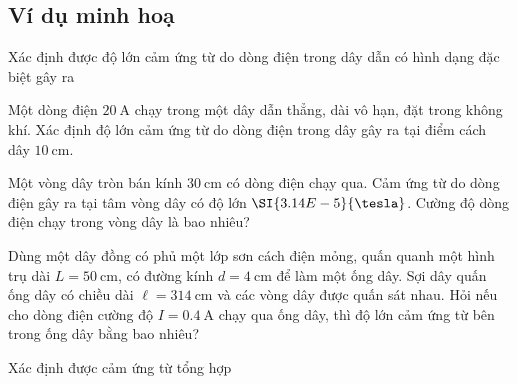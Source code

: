 \subsection{Ví dụ minh hoạ}
\begin{dang}{Xác định được độ lớn cảm ứng từ do dòng điện trong dây dẫn có hình dạng đặc biệt gây ra}
	\end{dang}
\begin{vd}
		Một dòng điện $\SI{20}{\ampere}$ chạy trong một dây dẫn thẳng, dài vô hạn, đặt trong không khí. Xác định độ lớn cảm ứng từ do dòng điện trong dây gây ra tại điểm cách dây $\SI{10}{\centi\meter}$.
\end{vd}
\begin{vd}
		Một vòng dây tròn bán kính $\SI{30}{\centi\meter}$ có dòng điện chạy qua. Cảm ứng từ do dòng điện gây ra tại tâm vòng dây có độ lớn $\SI{3.14E-5}{\tesla}$. Cường độ dòng điện chạy trong vòng dây là bao nhiêu?
\end{vd}
\begin{vd}
		Dùng một dây đồng có phủ một lớp sơn cách điện mỏng, quấn quanh một hình trụ dài $L=\SI{50}{\centi\meter}$, có đường kính $d=\SI{4}{\centi\meter}$ để làm một ống dây. Sợi dây quấn ống dây có chiều dài $\ell=\SI{314}{\centi\meter}$ và các vòng dây được quấn sát nhau. Hỏi nếu cho dòng điện cường độ $I=\SI{0.4}{\ampere}$ chạy qua ống dây, thì độ lớn cảm ứng từ bên trong ống dây bằng bao nhiêu?
\end{vd}
\begin{dang}{Xác định được cảm ứng từ tổng hợp}
\end{dang}
